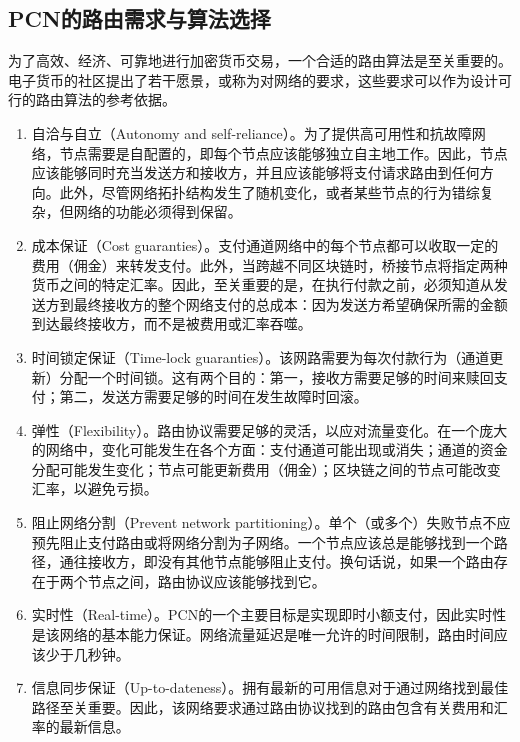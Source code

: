 \documentclass[12pt,a4paper]{article}
\begin{document}
\subsection{PCN的路由需求与算法选择}
为了高效、经济、可靠地进行加密货币交易，一个合适的路由算法是至关重要的。电子货币的社区提出了若干愿景\cite{beliefs}，或称为对网络的要求，这些要求可以作为设计可行的路由算法的参考依据。

\begin{enumerate}
	\item 自洽与自立（Autonomy and self-reliance）。为了提供高可用性和抗故障网络，节点需要是自配置的，即每个节点应该能够独立自主地工作。因此，节点应该能够同时充当发送方和接收方，并且应该能够将支付请求路由到任何方向。此外，尽管网络拓扑结构发生了随机变化，或者某些节点的行为错综复杂，但网络的功能必须得到保留。

	\item 成本保证（Cost guaranties）。支付通道网络中的每个节点都可以收取一定的费用（佣金）来转发支付。此外，当跨越不同区块链时，桥接节点将指定两种货币之间的特定汇率。因此，至关重要的是，在执行付款之前，必须知道从发送方到最终接收方的整个网络支付的总成本：因为发送方希望确保所需的金额到达最终接收方，而不是被费用或汇率吞噬。

	\item 时间锁定保证（Time-lock guaranties）。该网路需要为每次付款行为（通道更新）分配一个时间锁。这有两个目的：第一，接收方需要足够的时间来赎回支付；第二，发送方需要足够的时间在发生故障时回滚。

	\item 弹性（Flexibility）。路由协议需要足够的灵活，以应对流量变化。在一个庞大的网络中，变化可能发生在各个方面：支付通道可能出现或消失；通道的资金分配可能发生变化；节点可能更新费用（佣金）；区块链之间的节点可能改变汇率，以避免亏损。

	\item 阻止网络分割（Prevent network partitioning）。单个（或多个）失败节点不应预先阻止支付路由或将网络分割为子网络。一个节点应该总是能够找到一个路径，通往接收方，即没有其他节点能够阻止支付。换句话说，如果一个路由存在于两个节点之间，路由协议应该能够找到它。

	\item 实时性（Real-time）。PCN的一个主要目标是实现即时小额支付，因此实时性是该网络的基本能力保证。网络流量延迟是唯一允许的时间限制，路由时间应该少于几秒钟。

	\item 信息同步保证（Up-to-dateness）。拥有最新的可用信息对于通过网络找到最佳路径至关重要。因此，该网络要求通过路由协议找到的路由包含有关费用和汇率的最新信息。


\end{enumerate}
\end{document}
